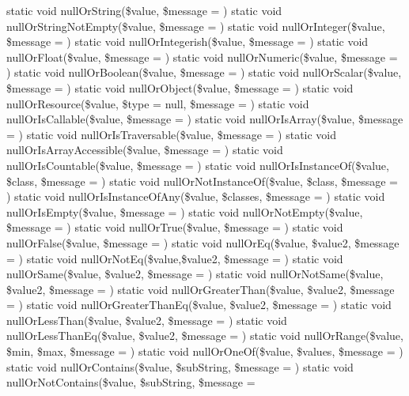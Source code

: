static void null\+Or\+String(\$value, \$message = \textquotesingle{}\textquotesingle{})  static void null\+Or\+String\+Not\+Empty(\$value, \$message = \textquotesingle{}\textquotesingle{})  static void null\+Or\+Integer(\$value, \$message = \textquotesingle{}\textquotesingle{})  static void null\+Or\+Integerish(\$value, \$message = \textquotesingle{}\textquotesingle{})  static void null\+Or\+Float(\$value, \$message = \textquotesingle{}\textquotesingle{})  static void null\+Or\+Numeric(\$value, \$message = \textquotesingle{}\textquotesingle{})  static void null\+Or\+Boolean(\$value, \$message = \textquotesingle{}\textquotesingle{})  static void null\+Or\+Scalar(\$value, \$message = \textquotesingle{}\textquotesingle{})  static void null\+Or\+Object(\$value, \$message = \textquotesingle{}\textquotesingle{})  static void null\+Or\+Resource(\$value, \$type = null, \$message = \textquotesingle{}\textquotesingle{})  static void null\+Or\+Is\+Callable(\$value, \$message = \textquotesingle{}\textquotesingle{})  static void null\+Or\+Is\+Array(\$value, \$message = \textquotesingle{}\textquotesingle{})  static void null\+Or\+Is\+Traversable(\$value, \$message = \textquotesingle{}\textquotesingle{})  static void null\+Or\+Is\+Array\+Accessible(\$value, \$message = \textquotesingle{}\textquotesingle{})  static void null\+Or\+Is\+Countable(\$value, \$message = \textquotesingle{}\textquotesingle{})  static void null\+Or\+Is\+Instance\+Of(\$value, \$class, \$message = \textquotesingle{}\textquotesingle{})  static void null\+Or\+Not\+Instance\+Of(\$value, \$class, \$message = \textquotesingle{}\textquotesingle{})  static void null\+Or\+Is\+Instance\+Of\+Any(\$value, \$classes, \$message = \textquotesingle{}\textquotesingle{})  static void null\+Or\+Is\+Empty(\$value, \$message = \textquotesingle{}\textquotesingle{})  static void null\+Or\+Not\+Empty(\$value, \$message = \textquotesingle{}\textquotesingle{})  static void null\+Or\+True(\$value, \$message = \textquotesingle{}\textquotesingle{})  static void null\+Or\+False(\$value, \$message = \textquotesingle{}\textquotesingle{})  static void null\+Or\+Eq(\$value, \$value2, \$message = \textquotesingle{}\textquotesingle{})  static void null\+Or\+Not\+Eq(\$value,\$value2, \$message = \textquotesingle{}\textquotesingle{})  static void null\+Or\+Same(\$value, \$value2, \$message = \textquotesingle{}\textquotesingle{})  static void null\+Or\+Not\+Same(\$value, \$value2, \$message = \textquotesingle{}\textquotesingle{})  static void null\+Or\+Greater\+Than(\$value, \$value2, \$message = \textquotesingle{}\textquotesingle{})  static void null\+Or\+Greater\+Than\+Eq(\$value, \$value2, \$message = \textquotesingle{}\textquotesingle{})  static void null\+Or\+Less\+Than(\$value, \$value2, \$message = \textquotesingle{}\textquotesingle{})  static void null\+Or\+Less\+Than\+Eq(\$value, \$value2, \$message = \textquotesingle{}\textquotesingle{})  static void null\+Or\+Range(\$value, \$min, \$max, \$message = \textquotesingle{}\textquotesingle{})  static void null\+Or\+One\+Of(\$value, \$values, \$message = \textquotesingle{}\textquotesingle{})  static void null\+Or\+Contains(\$value, \$sub\+String, \$message = \textquotesingle{}\textquotesingle{})  static void null\+Or\+Not\+Contains(\$value, \$sub\+String, \$message = 
